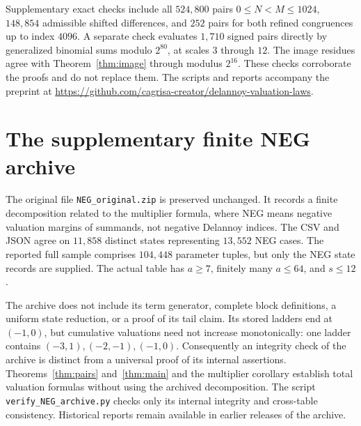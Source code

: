 \documentclass[11pt]{article}
\theoremstyle{remark}\newtheorem{remark}[theorem]{Remark}
\begin{document}
Supplementary exact checks include all $524{,}800$ pairs
$0\le N<M\le1024$, $148{,}854$ admissible shifted differences,
and $252$ pairs for both refined congruences up to index $4096$.
A separate check evaluates $1{,}710$ signed pairs directly by generalized
binomial sums modulo $2^{80}$, at scales $3$ through $12$.
The image residues agree with Theorem~\ref{thm:image} through modulus
$2^{16}$. These checks corroborate the proofs and do not replace them.
The scripts and reports accompany the preprint at
\url{https://github.com/cagrisa-creator/delannoy-valuation-laws}.

\appendix
\section{The supplementary finite NEG archive}\label{sec:neg-archive}
The original file \texttt{NEG\_original.zip} is preserved unchanged.
It records a finite decomposition related to the multiplier formula,
where NEG means negative valuation margins of summands, not negative
Delannoy indices. The CSV and JSON agree on $11{,}858$ distinct states
representing $13{,}552$ NEG cases. The reported full sample comprises
$104{,}448$ parameter tuples, but only the NEG state records are supplied.
The actual table has $a\ge7$, finitely many $a\le64$, and $s\le12$.

The archive does not include its term generator, complete block
definitions, a uniform state reduction, or a proof of its tail claim.
Its stored ladders end at $(-1,0)$, but cumulative valuations need not
increase monotonically: one ladder contains $(-3,1),(-2,-1),(-1,0)$.
Consequently an integrity check of the archive is distinct from a
universal proof of its internal assertions. Theorems~\ref{thm:pairs}
and~\ref{thm:main} and the multiplier corollary establish total
valuation formulas without using the archived decomposition.
The script \texttt{verify\_NEG\_archive.py} checks only its internal
integrity and cross-table consistency. Historical reports remain
available in earlier releases of the archive.
\end{document}
